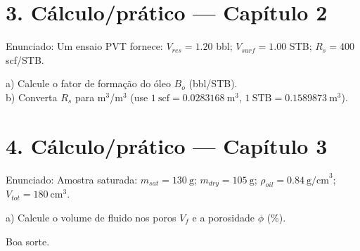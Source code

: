 \documentclass[11pt,a4paper]{article}
\begin{document}
\section*{3. C\'alculo/pr\'atico — Cap\'itulo 2}
Enunciado: Um ensaio PVT fornece: $V_{res}=1.20$ bbl; $V_{surf}=1.00$ STB; $R_s=400$ scf/STB.

a) Calcule o fator de forma\c{c}\~ao do \'oleo $B_o$ (bbl/STB).\\
b) Converta $R_s$ para m$^3$/m$^3$ (use $1\ \mathrm{scf}=0.0283168\ \mathrm{m}^3$, $1\ \mathrm{STB}=0.1589873\ \mathrm{m}^3$).

\vspace{8\baselineskip}

\section*{4. C\'alculo/pr\'atico — Cap\'itulo 3}
Enunciado: Amostra saturada: $m_{sat}=130\ \mathrm{g}$; $m_{dry}=105\ \mathrm{g}$; $\rho_{oil}=0.84\ \mathrm{g/cm}^3$; $V_{tot}=180\ \mathrm{cm}^3$.

a) Calcule o volume de fluido nos poros $V_f$ e a porosidade $\phi$ (\%).

\vspace{8\baselineskip}

\bigskip
\noindent Boa sorte.
\end{document}
